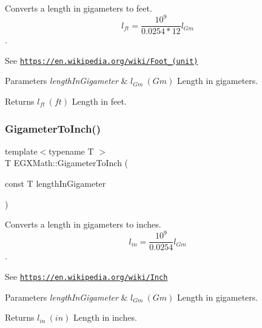 Converts a length in gigameters to feet. \[ l_{ft}= \frac{10^{9}}{0.0254 * 12} l_{Gm} \]. 

See \href{https://en.wikipedia.org/wiki/Foot_(unit)}{\tt https\+://en.\+wikipedia.\+org/wiki/\+Foot\+\_\+(unit)} 
\begin{DoxyParams}{Parameters}
{\em length\+In\+Gigameter} & $ l_{Gm}\ (Gm)$ Length in gigameters. \\
\hline
\end{DoxyParams}
\begin{DoxyReturn}{Returns}
$ l_{ft}\ (ft)$ Length in feet. 
\end{DoxyReturn}
\mbox{\label{group___e_g_x_math-_conversions-_length_conversions-_s_i-_gigameter-_imperial_gacff04b5343e94d6e31e601578d190fb8}} 
\subsubsection{\texorpdfstring{Gigameter\+To\+Inch()}{GigameterToInch()}}
{\footnotesize\ttfamily template$<$typename T $>$ \\
T E\+G\+X\+Math\+::\+Gigameter\+To\+Inch (\begin{DoxyParamCaption}\item[{const T}]{length\+In\+Gigameter }\end{DoxyParamCaption})}



Converts a length in gigameters to inches. \[ l_{in}= \frac{10^{9}}{0.0254} l_{Gm} \]. 

See \href{https://en.wikipedia.org/wiki/Inch}{\tt https\+://en.\+wikipedia.\+org/wiki/\+Inch} 
\begin{DoxyParams}{Parameters}
{\em length\+In\+Gigameter} & $ l_{Gm}\ (Gm)$ Length in gigameters. \\
\hline
\end{DoxyParams}
\begin{DoxyReturn}{Returns}
$ l_{in}\ (in)$ Length in inches. 
\end{DoxyReturn}
\mbox{\label{group___e_g_x_math-_conversions-_length_conversions-_s_i-_gigameter-_imperial_ga498a43d44c0c0f6527362688d6cc361f}} 
